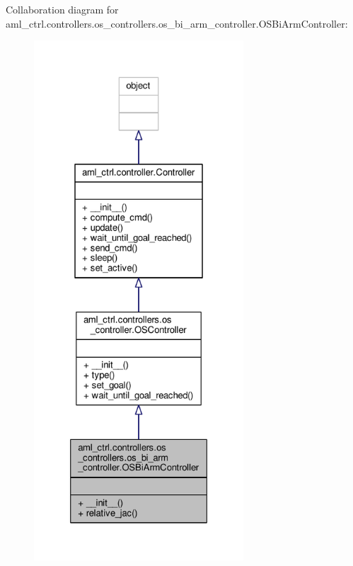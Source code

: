 Collaboration diagram for aml\-\_\-ctrl.\-controllers.\-os\-\_\-controllers.\-os\-\_\-bi\-\_\-arm\-\_\-controller.\-O\-S\-Bi\-Arm\-Controller\-:\nopagebreak
\begin{figure}[H]
\begin{center}
\leavevmode
\includegraphics[height=550pt]{classaml__ctrl_1_1controllers_1_1os__controllers_1_1os__bi__arm__controller_1_1_o_s_bi_arm_controller__coll__graph}
\end{center}
\end{figure}
